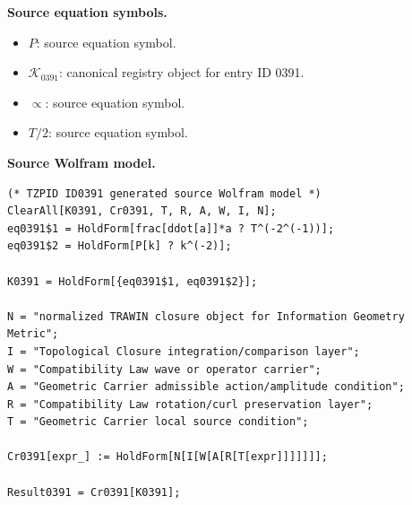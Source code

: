 \begin{minipage}[t]{0.49\linewidth}
\begingroup
\small
\raggedright
\textbf{Source equation symbols.}\par
\begin{itemize}[leftmargin=1.35em,itemsep=1pt,topsep=1pt,parsep=0pt]
    \item $P$: source equation symbol.
    \item $\mathcal{K}_{0391}$: canonical registry object for entry ID 0391.
    \item $\propto$: source equation symbol.
    \item $T/2$: source equation symbol.
\end{itemize}
\endgroup
\end{minipage}\hfill
\begin{minipage}[t]{0.47\linewidth}
\begingroup
\scriptsize
\raggedright
\textbf{Source Wolfram model.}\par
\begin{Verbatim}[fontsize=\tiny,breaklines=true,breakanywhere=true]
(* TZPID ID0391 generated source Wolfram model *)
ClearAll[K0391, Cr0391, T, R, A, W, I, N];
eq0391$1 = HoldForm[frac[ddot[a]]*a ? T^(-2^(-1))];
eq0391$2 = HoldForm[P[k] ? k^(-2)];

K0391 = HoldForm[{eq0391$1, eq0391$2}];

N = "normalized TRAWIN closure object for Information Geometry Metric";
I = "Topological Closure integration/comparison layer";
W = "Compatibility Law wave or operator carrier";
A = "Geometric Carrier admissible action/amplitude condition";
R = "Compatibility Law rotation/curl preservation layer";
T = "Geometric Carrier local source condition";

Cr0391[expr_] := HoldForm[N[I[W[A[R[T[expr]]]]]]];

Result0391 = Cr0391[K0391];
\end{Verbatim}
\endgroup
\end{minipage}

